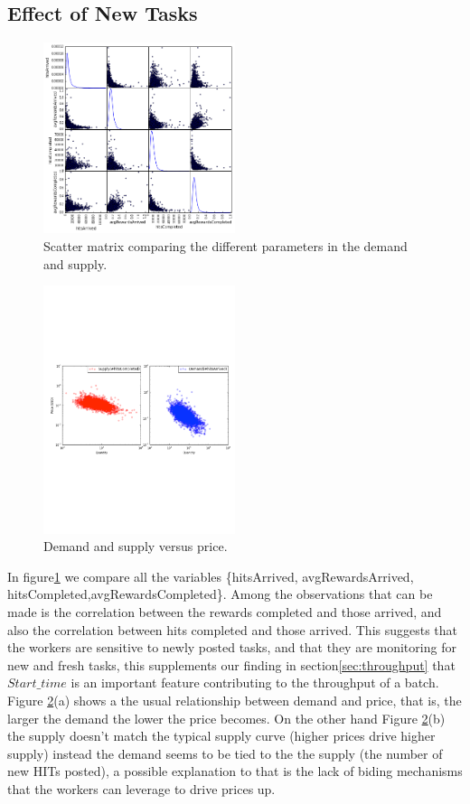\subsection{Effect of New Tasks}
\begin{figure}[htbp]
	\centering
		\includegraphics[width=0.5\textwidth]{figures/scattermatrix}
	\caption{Scatter matrix comparing the different parameters in the demand and supply.}
	\label{fig:scatter_matrix}
\end{figure}
\begin{figure}[htbp]
	\centering
		\includegraphics[width=0.5\textwidth]{figures/supply_demand}
	\caption{Demand and supply versus price.}
	\label{fig:dsup}
\end{figure}
In figure\ref{fig:scatter_matrix} we compare all the variables \{hitsArrived, avgRewardsArrived, hitsCompleted,avgRewardsCompleted\}. Among the observations that can be made is the correlation between the rewards completed and those arrived, and also the correlation between hits completed and those arrived. This suggests that the workers are sensitive to newly posted tasks, and that they are monitoring for new and fresh tasks, this supplements our finding in section\ref{sec:throughput} that $Start\_time$ is an important feature contributing to the throughput of a batch.
Figure \ref{fig:dsup}(a) shows a the usual relationship between demand and price, that is, the larger the demand the lower the price becomes. On the other hand Figure \ref{fig:dsup}(b) the supply doesn't match the typical supply curve (higher prices drive higher supply) instead the demand seems to be tied to the the supply (the number of new HITs posted), a possible explanation to that is the lack of biding mechanisms that the workers can leverage to drive prices up.

